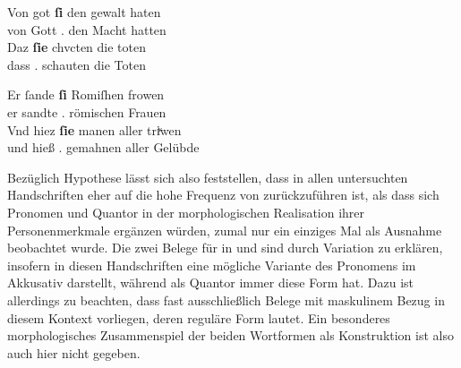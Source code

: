 \begin{exe}
\ex \label{ex:vbsisie}
 	\begin{xlist}
 	\ex \gll Von got \textbf{ſi} den gewalt haten \\
		     von Gott \Tpl\subM.\Nom{} den Macht hatten \\
 	\sn \gll Daz \textbf{ſie} chvcten die toten \\
		     dass \Tpl\subM.\Nom{} schauten die Toten \\
		\begin{taggedline}{\parencites[\pno~42\ra, 38--39]{kc:VB}[vgl.][8664--8665]{schroeder1895}}
		\trans {}
		\end{taggedline}
 		\label{ex:vbsisie_1}

	\ex \gll Er ſande \textbf{ſi} Romiſhen frowen \\
		     er sandte \Tpl\subI.\Acc{} römischen Frauen \\
	\sn \gll Vnd hiez \textbf{ſie} manen aller triͮwen \\
		     und hieß \Tpl\subF.\Acc{} gemahnen aller Gelübde \\
		\begin{taggedline}{\parencites[\pno~50\va, 5--6]{kc:VB}[vgl.][10467--10468]{schroeder1895}}
		\trans {}
		\end{taggedline}
		\label{ex:vbsisie_2}
	\end{xlist}
\end{exe}

Bezüglich  Hypothese lässt sich also feststellen, dass
 in allen unter\-suchten Handschriften eher auf die hohe Frequenz
von  zurückzuführen ist, als dass sich Pro\-nomen und Quantor in der
morphologischen Realisation ihrer Personenmerkmale ergänzen würden, zumal
 nur ein einziges Mal als Ausnahme beobachtet wurde. Die zwei
Belege für  in \citet{kc:A1} und \citet{kc:M} sind durch
Variation zu erklären, insofern  in diesen Handschriften eine
mög\-liche Variante des Pronomens im Akkusativ darstellt, während 
als Quantor immer diese Form hat. Dazu ist allerdings zu beachten, dass fast
ausschließlich Belege mit maskulinem Bezug in diesem Kontext vorliegen, deren
reguläre Form  lautet. Ein besonderes morphologisches Zusammenspiel
der beiden Wortformen als Konstruktion ist also auch hier nicht gegeben.

